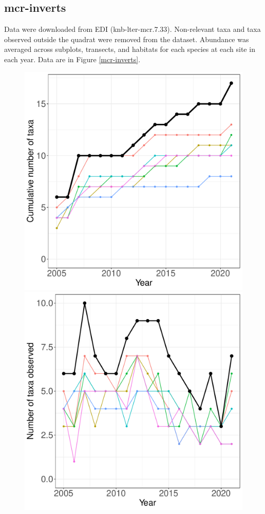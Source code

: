 \documentclass[11pt, oneside]{article}
\begin{document}
\subsection {mcr-inverts}
Data were downloaded from EDI (knb-lter-mcr.7.33).
Non-relevant taxa and taxa observed outside the quadrat were removed from the dataset.
Abundance was averaged across subplots, transects, and habitats for each species at each site in each year.
Data are in Figure \ref{mcr-inverts}.

\begin{figure}[h!]
\centering
\includegraphics[scale = 0.4]{mcr-inverts-castorani_species_accumulation_curve.pdf}
\includegraphics[scale = 0.4]{mcr-inverts-castorani_num_taxa_over_time.pdf}

\end{figure}
\end{document}
